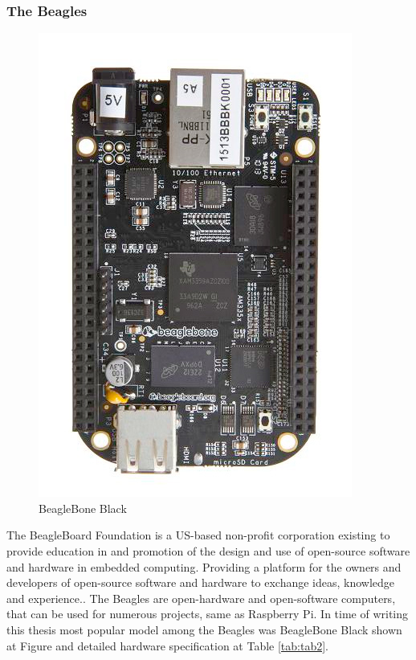 \subsubsection{The Beagles} %
\label{ssub:the_beagles}
\begin{figure}[H]
\begin{center}
\captionsetup{font=small}
\includegraphics[scale=0.4]{pics/beagle.jpg}
\caption{BeagleBone Black}
\label{fig:ch4}
\end{center}
\end{figure}
The BeagleBoard Foundation is a US-based non-profit corporation existing to provide education in and promotion of the design and use of open-source software and hardware in embedded computing. Providing a platform for the owners and developers of open-source software and hardware to exchange ideas, knowledge and experience.\cite{beagle_what}. The Beagles are open-hardware and open-software computers, that can be used for numerous projects, same as Raspberry Pi. In time of writing this thesis most popular model among the Beagles was BeagleBone Black shown at Figure and detailed hardware specification at Table \ref{tab:tab2}.
